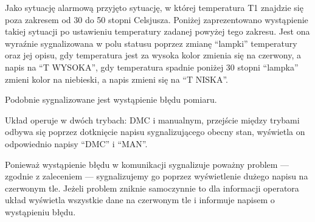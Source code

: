 \begin{figure}[ht]
\centering
{}
\label{R4}
\end{figure}


Jako sytuację alarmową przyjęto sytuację, w której temperatura T1 znajdzie się poza zakresem od 30 do 50 stopni Celsjusza. Poniżej zaprezentowano wystąpienie takiej sytuacji po ustawieniu temperatury zadanej powyżej tego zakresu. Jest ona wyraźnie sygnalizowana w polu statusu poprzez zmianę ``lampki'' temperatury oraz jej opisu, gdy temperatura jest za wysoka kolor zmienia się na czerwony, a napis na ``T WYSOKA'', gdy temperatura spadnie poniżej 30 stopni ``lampka'' zmieni kolor na niebieski, a napis zmieni się na ``T NISKA''.


\begin{figure}[ht]
\centering
{}
\label{R1}
\end{figure}


Podobnie sygnalizowane jest wystąpienie błędu pomiaru.


\begin{figure}[ht]
\centering
{}
\label{R3}
\end{figure}


Układ operuje w dwóch trybach: DMC i manualnym, przejście między trybami odbywa się poprzez dotknięcie napisu sygnalizującego obecny stan, wyświetla on odpowiednio napisy ``DMC'' i ``MAN''.


\begin{figure}[ht]
\centering
{}
\label{R2}
\end{figure}


Ponieważ wystąpienie błędu w komunikacji sygnalizuje poważny problem --- zgodnie z zaleceniem --- sygnalizujemy go poprzez wyświetlenie dużego napisu na czerwonym tle. Jeżeli problem zniknie samoczynnie to dla informacji operatora układ wyświetla wszystkie dane na czerwonym tle i informuje napisem o wystąpieniu błędu.


\begin{figure}[ht]
\centering
{}
\label{R5}
\end{figure}


\begin{figure}[ht]
\centering
{}
\label{R6}
\end{figure}

